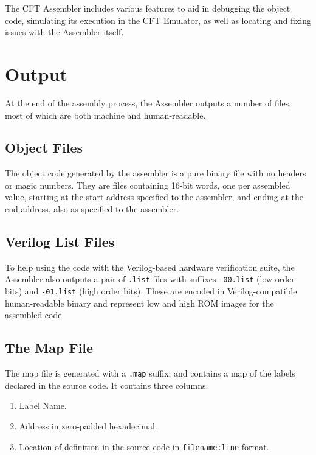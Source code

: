 \documentclass[11pt,a4paper,twocolumns]{article}
\begin{document}
The CFT Assembler includes various features to aid in debugging the object
code, simulating its execution in the CFT Emulator, as well as locating and
fixing issues with the Assembler itself.

\section{Output}

At the end of the assembly process, the Assembler outputs a number of files,
most of which are both machine and human-readable.

\subsection{Object Files}

The object code generated by the assembler is a pure binary file with no
headers or magic numbers. They are files containing 16-bit words, one per
assembled value, starting at the start address specified to the assembler, and
ending at the end address, also as specified to the assembler.

\subsection{Verilog List Files}

To help using the code with the Verilog-based hardware verification suite, the
Assembler also outputs a pair of {\tt .list} files with suffixes {\tt -00.list}
(low order bits) and {\tt -01.list} (high order bits). These are encoded in
Verilog-compatible human-readable binary and represent low and high ROM images
for the assembled code.

\subsection{The Map File}

The map file is generated with a {\tt .map} suffix, and contains a map of the
labels declared in the source code. It contains three columns:

\begin{enumerate}
\item Label Name.
\item Address in zero-padded hexadecimal.
\item Location of definition in the source code in {\tt filename:line} format.
\end{enumerate}
\end{document}
